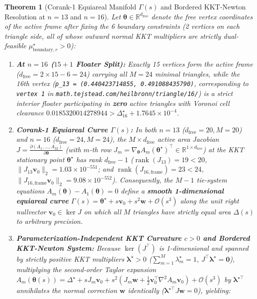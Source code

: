 \documentclass[11pt,a4paper]{article}
\newtheorem{theorem}{Theorem}
\begin{document}
\begin{theorem}[Corank-1 Equiareal Manifold $\Gamma(s)$ and Bordered KKT-Newton Resolution at $n=13$ and $n=16$]
\label{thm:heilbronn_corank1}
Let $\boldsymbol{\theta} \in \mathbb{R}^{d_{\text{free}}}$ denote the free vertex coordinates of the active frame after fixing the 6 boundary constraints (2 vertices on each triangle side, all of whose outward normal KKT multipliers are strictly dual-feasible $\mu_{\text{boundary}, r}^\star > 0$):
\begin{enumerate}
\item \textbf{At $n = 16$ ($15 + 1$ Floater Split):} Exactly 15 vertices form the active frame ($d_{\text{free}} = 2\times 15 - 6 = 24$) carrying all $M = 24$ minimal triangles, while the 16th vertex (\texttt{p\_13 = (0.440423714855, 0.491088435790)}, corresponding to \texttt{vertex 1} in \texttt{math.tejstead.com/heilbronn/triangle/16/}) is a strict interior floater participating in \textbf{zero} active triangles with Voronoi cell clearance $\mathbf{0.0185320014278944} > \Delta_{16}^\star + 1.7645 \times 10^{-4}$.
\item \textbf{Corank-1 Equiareal Curve $\Gamma(s)$:} In both $n=13$ ($d_{\text{free}} = 20, M = 20$) and $n=16$ ($d_{\text{free}} = 24, M = 24$), the $M \times d_{\text{free}}$ active area Jacobian $J = \frac{\partial(A_1, \dots, A_M)}{\partial \boldsymbol{\theta}}$ (with $m$-th row $J_m = \nabla_{\boldsymbol{\theta}} A_m(\boldsymbol{\theta}^\star)^\top \in \mathbb{R}^{1 \times d_{\text{free}}}$) at the KKT stationary point $\boldsymbol{\theta}^\star$ has rank $d_{\text{free}} - 1$ ($\operatorname{rank}(J_{13}) = 19 < 20$, $\|J_{13}\mathbf{v}_0\|_2 = 1.03\times 10^{-551}$; and $\operatorname{rank}(J_{16,\text{frame}}) = 23 < 24$, $\|J_{16,\text{frame}}\mathbf{v}_0\|_2 = 9.08\times 10^{-552}$). Consequently, the $M-1$ tie-system equations $A_m(\boldsymbol{\theta}) - A_1(\boldsymbol{\theta}) = 0$ define a \textbf{smooth 1-dimensional equiareal curve} $\Gamma(s) = \boldsymbol{\theta}^\star + s\mathbf{v}_0 + s^2\mathbf{w} + \mathcal{O}(s^3)$ along the unit right nullvector $\mathbf{v}_0 \in \ker J$ on which all $M$ triangles have strictly equal area $\Delta(s)$ to arbitrary precision.
\item \textbf{Parameterization-Independent KKT Curvature $c > 0$ and Bordered KKT-Newton System:} Because $\ker(J^\top)$ is 1-dimensional and spanned by strictly positive KKT multipliers $\boldsymbol{\lambda}^\star > 0$ ($\sum_{m=1}^M \lambda_m^\star = 1$, $J^\top \boldsymbol{\lambda}^\star = \mathbf{0}$), multiplying the second-order Taylor expansion $A_m(\boldsymbol{\theta}(s)) = \Delta^\star + s J_m \mathbf{v}_0 + s^2 \left(J_m \mathbf{w} + \frac{1}{2}\mathbf{v}_0^\top \nabla^2 A_m \mathbf{v}_0\right) + \mathcal{O}(s^3)$ by $\boldsymbol{\lambda}^{\star\top}$ annihilates the normal correction $\mathbf{w}$ identically ($\boldsymbol{\lambda}^{\star\top} J \mathbf{w} = 0$), yielding:

\end{enumerate}
\end{theorem}
\end{document}
